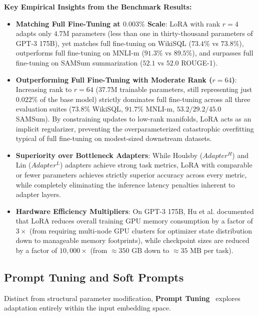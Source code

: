 \documentclass[../../../main.tex]{subfiles}
\begin{document}
\noindent\textbf{Key Empirical Insights from the Benchmark Results:}
\begin{itemize}
    \item \textbf{Matching Full Fine-Tuning at $0.003\%$ Scale}: LoRA with rank $r = 4$ adapts only $4.7\text{M}$ parameters (less than one in thirty-thousand parameters of GPT-3 175B), yet matches full fine-tuning on WikiSQL ($73.4\%$ vs $73.8\%$), outperforms full fine-tuning on MNLI-m ($91.3\%$ vs $89.5\%$), and surpasses full fine-tuning on SAMSum summarization ($52.1$ vs $52.0$ ROUGE-1).
    \item \textbf{Outperforming Full Fine-Tuning with Moderate Rank ($r = 64$)}: Increasing rank to $r = 64$ ($37.7\text{M}$ trainable parameters, still representing just $0.022\%$ of the base model) strictly dominates full fine-tuning across all three evaluation suites ($73.8\%$ WikiSQL, $91.7\%$ MNLI-m, $53.2 / 29.2 / 45.0$ SAMSum). By constraining updates to low-rank manifolds, LoRA acts as an implicit regularizer, preventing the overparameterized catastrophic overfitting typical of full fine-tuning on modest-sized downstream datasets.
    \item \textbf{Superiority over Bottleneck Adapters}: While Houlsby ($Adapter^H$) and Lin ($Adapter^L$) adapters achieve strong task metrics, LoRA with comparable or fewer parameters achieves strictly superior accuracy across every metric, while completely eliminating the inference latency penalties inherent to adapter layers.
    \item \textbf{Hardware Efficiency Multipliers}: On GPT-3 175B, Hu et al. documented that LoRA reduces overall training GPU memory consumption by a factor of \textbf{$3\times$} (from requiring multi-node GPU clusters for optimizer state distribution down to manageable memory footprints), while checkpoint sizes are reduced by a factor of \textbf{$10{,}000\times$} (from $\approx 350\text{ GB}$ down to $\approx 35\text{ MB}$ per task).
\end{itemize}

\subsection{Prompt Tuning and Soft Prompts}
\label{subsec:prompt_tuning_soft}

Distinct from structural parameter modification, \textbf{Prompt Tuning}~\citep{lester2021power} explores adaptation entirely within the input embedding space.
\end{document}
